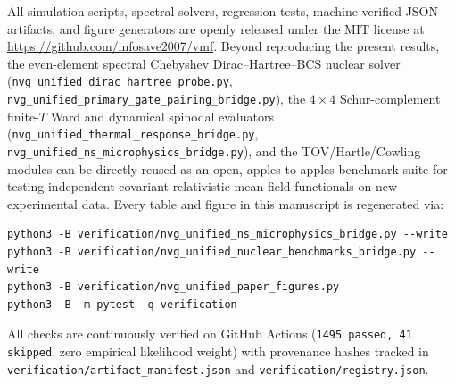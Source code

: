 \documentclass[aps,prc,twocolumn,superscriptaddress,nofootinbib,floatfix]{revtex4-2}
\begin{document}
All simulation scripts, spectral solvers, regression tests, machine-verified JSON artifacts, and figure generators are openly released under the MIT license at \url{https://github.com/infosave2007/vmf}. Beyond reproducing the present results, the even-element spectral Chebyshev Dirac--Hartree--BCS nuclear solver (\texttt{nvg\_unified\_dirac\_hartree\_probe.py}, \texttt{nvg\_unified\_primary\_gate\_pairing\_bridge.py}), the $4\times 4$ Schur-complement finite-$T$ Ward and dynamical spinodal evaluators (\texttt{nvg\_unified\_thermal\_response\_bridge.py}, \texttt{nvg\_unified\_ns\_microphysics\_bridge.py}), and the TOV/Hartle/Cowling modules can be directly reused as an open, apples-to-apples benchmark suite for testing independent covariant relativistic mean-field functionals on new experimental data. Every table and figure in this manuscript is regenerated via:
\begin{verbatim}
python3 -B verification/nvg_unified_ns_microphysics_bridge.py --write
python3 -B verification/nvg_unified_nuclear_benchmarks_bridge.py --write
python3 -B verification/nvg_unified_paper_figures.py
python3 -B -m pytest -q verification
\end{verbatim}
All checks are continuously verified on GitHub Actions (\texttt{1495 passed, 41 skipped}, zero empirical likelihood weight) with provenance hashes tracked in \texttt{verification/artifact\_manifest.json} and \texttt{verification/registry.json}.
\end{document}
